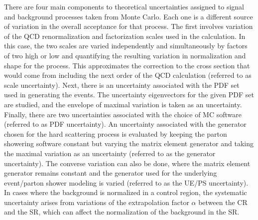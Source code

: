 There are four main components to theoretical uncertainties assigned to signal and background processes taken from Monte Carlo. Each one is a different source of variation in the overall acceptance for that process. The first involves variation of the QCD renormalization and factorization scales used in the calculation. In this case, the two scales are varied independently and simultaneously by factors of two high or low and quantifying the resulting variation in normalization and shape for the process.  This approximates the correction to the cross section that would come from including the next order of the QCD calculation (referred to as scale uncertainty). Next, there is an uncertainty associated with the PDF set used in generating the events. The uncertainty eigenvectors for the given PDF set are studied, and the envelope of maximal variation is taken as an uncertainty. Finally, there are two uncertainties associated with the choice of MC software (referred to as PDF uncertainty). An uncertainty associated with the generator chosen for the hard scattering process is evaluated by keeping the parton showering software constant but varying the matrix element generator and taking the maximal variation as an uncertainty (referred to as the generator uncertainty). The converse variation can also be done, where the matrix element generator remains constant and the generator used for the underlying event/parton shower modeling is varied (referred to as the UE/PS uncertainty). In cases where the background is normalized in a control region, the systematic uncertainty arises from variations of the extrapolation factor $\alpha$ between the CR and the SR, which can affect the normalization of the background in the SR. 



